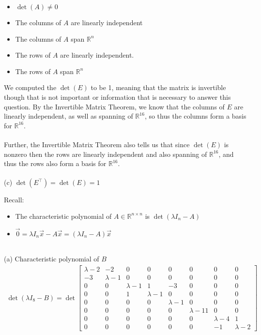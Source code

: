 \documentclass{report}
\begin{document}
\begin{itemize}
\item $\det(A) \neq 0$
\item The columns of $A$ are linearly independent
\item The columns of $A$ span $\mathbb{R}^n$
\item The rows of $A$ are linearly independent.
\item The rows of $A$ span $\mathbb{R}^n$
\end{itemize}
We computed the $\det(E)$ to be 1,  meaning that the matrix is invertible though that is not important or information that is necessary to answer this question.  By the Invertible Matrix Theorem,  we know that the columns of $E$ are linearly independent,  as well as spanning of $\mathbb{R}^{16}$,  so thus the columns form a basis for $\mathbb{R}^{16}$. \\
\\ \noindent Further, the Invertible Matrix Theorem also tells us that since $\det(E)$ is nonzero then the rows are linearly independent and also spanning of $\mathbb{R}^{16}$,  and thus the rows also form a basis for $\mathbb{R}^{16}$.  \\
\\ \noindent(c) $\det(E^{\top}) = \det(E) = 1$
\begin{note}
Recall:
\begin{itemize}
\item The characteristic polynomial of $A\in\mathbb{R}^{n\times n}$ is $\det(\lambda I_n - A)$
\item $\vec{0} = \lambda I_n \vec{x} - A\vec{x} = (\lambda I_n - A)\vec{x}$
\end{itemize}
\end{note}
\sol \\
(a) Characteristic polynomial of $B$
$$
\begin{aligned}
\det(\lambda I_8 - B) = \det\begin{bmatrix}
\lambda-2&-2&0&0&0&0&0&0\\
-3&\lambda-1&0&0&0&0&0&0\\
0&0&\lambda-1&1&-3&0&0&0\\
0&0&1&\lambda-1&0&0&0&0 \\
0&0&0&0&\lambda-1&0&0&0\\
0&0&0&0&0&\lambda-11&0&0\\
0&0&0&0&0&0&\lambda-4&1\\
0&0&0&0&0&0&-1&\lambda-2
\end{bmatrix}
\end{aligned}
$$
\end{document}
